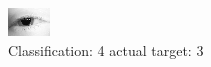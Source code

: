 \begin{figure}[h!]
\begin{center}
\includegraphics[width=0.60\columnwidth]{figures/ID156_class_4_target_3.png}
\end{center}
\caption{ Classification: 4 actual target: 3}
\label{fig:ID156_class_4_target_3}
\end{figure}
